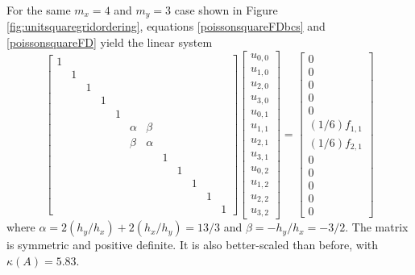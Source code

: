 \medskip\noindent\hrulefill
\begin{example} \label{exampleredo} For the same $m_x=4$ and $m_y=3$ case shown in Figure \ref{fig:unitsquaregridordering}, equations \eqref{poissonsquareFDbcs} and \eqref{poissonsquareFD} yield the linear system
\begin{equation*}
\begin{bmatrix}
1 &  &  &  &  &  &  &  &  &  &  &  \\
  & 1&  &  &  &  &  &  &  &  &  &  \\
  &  & 1&  &  &  &  &  &  &  &  &  \\
  &  &  & 1&  &  &  &  &  &  &  &  \\
  &  &  &  & 1&  &  &  &  &  &  &  \\
  &  &  &  &  & \alpha& \beta&  &  &  &  &  \\
  &  &  &  &  & \beta& \alpha&  &  &  &  &  \\
  &  &  &  &  &  &  & 1&  &  &  &  \\
  &  &  &  &  &  &  &  & 1&  &  &  \\
  &  &  &  &  &  &  &  &  & 1&  &  \\
  &  &  &  &  &  &  &  &  &  & 1&  \\
  &  &  &  &  &  &  &  &  &  &  & 1
\end{bmatrix}
\begin{bmatrix}
u_{0,0} \\
u_{1,0} \\
u_{2,0} \\
u_{3,0} \\
u_{0,1} \\
u_{1,1} \\
u_{2,1} \\
u_{3,1} \\
u_{0,2} \\
u_{1,2} \\
u_{2,2} \\
u_{3,2}
\end{bmatrix}
=
\begin{bmatrix}
0 \\
0 \\
0 \\
0 \\
0 \\
(1/6) f_{1,1} \\
(1/6) f_{2,1} \\
0 \\
0 \\
0 \\
0 \\
0
\end{bmatrix}
\end{equation*}
where $\alpha = 2 (h_y/h_x) + 2 (h_x/h_y) = 13/3$ and $\beta = - h_y/h_x = - 3/2$.  The matrix is symmetric and positive definite.  It is also better-scaled than before, with $\kappa(A)=5.83$.

\noindent\hrulefill
\end{example}


